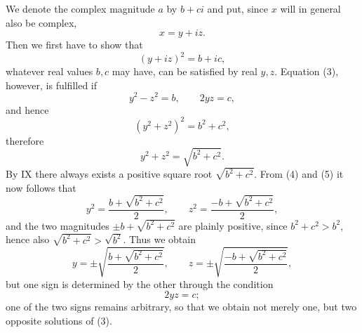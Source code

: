 \documentclass[11pt]{article}
\begin{document}
We denote the complex magnitude $a$ by $b+ci$ and put, since $x$ will in general also be complex,
\[
 x=y+iz.
\]
Then we first have to show that
\begin{equation}
 (y+iz)^2=b+ic,
\tag{3}
\end{equation}
whatever real values $b,c$ may have, can be satisfied by real $y,z$. Equation (3), however, is fulfilled if
\begin{equation}
 y^2-z^2=b,
\qquad 2yz=c,
\tag{4}
\end{equation}
and hence
\[
 (y^2+z^2)^2=b^2+c^2,
\]
therefore
\begin{equation}
 y^2+z^2=\sqrt{b^2+c^2}.
\tag{5}
\end{equation}
By IX there always exists a positive square root $\sqrt{b^2+c^2}$. From (4) and (5) it now follows that
\[
 y^2=\frac{b+\sqrt{b^2+c^2}}{2},\qquad
 z^2=\frac{-b+\sqrt{b^2+c^2}}{2},
\]
and the two magnitudes $\pm b+\sqrt{b^2+c^2}$ are plainly positive, since $b^2+c^2>b^2$, hence also $\sqrt{b^2+c^2}>\sqrt{b^2}$. Thus we obtain
\[
 y=\pm\sqrt{\frac{b+\sqrt{b^2+c^2}}{2}},\qquad
 z=\pm\sqrt{\frac{-b+\sqrt{b^2+c^2}}{2}},
\]
but one sign is determined by the other through the condition
\[
 2yz=c;
\]
one of the two signs remains arbitrary, so that we obtain not merely one, but two opposite solutions of (3).
\end{document}
